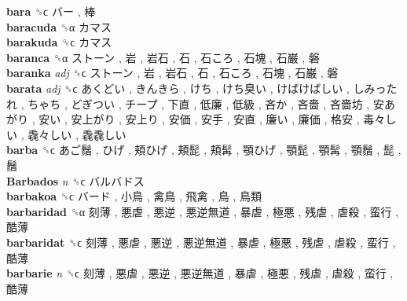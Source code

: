 \textbf{bara} ␝ϲ   バー ,  棒   \\
\textbf{baracuda} ␝α   カマス   \\
\textbf{barakuda} ␝ϲ   カマス   \\
\textbf{baranca} ␝α   ストーン ,  岩 ,  岩石 ,  石 ,  石ころ ,  石塊 ,  石巌 ,  磐   \\
\textbf{baranka} \emph{adj}  ␝ϲ   ストーン ,  岩 ,  岩石 ,  石 ,  石ころ ,  石塊 ,  石巌 ,  磐   \\
\textbf{barata} \emph{adj}  ␝ϲ   あくどい ,  きんきら ,  けち ,  けち臭い ,  けばけばしい ,  しみったれ ,  ちゃち ,  どぎつい ,  チープ ,  下直 ,  低廉 ,  低級 ,  吝か ,  吝嗇 ,  吝嗇坊 ,  安あがり ,  安い ,  安上がり ,  安上り ,  安価 ,  安手 ,  安直 ,  廉い ,  廉価 ,  格安 ,  毒々しい ,  毳々しい ,  毳毳しい   \\
\textbf{barba} ␝ϲ   あご鬚 ,  ひげ ,  頬ひげ ,  頬髭 ,  頬髯 ,  顎ひげ ,  顎髭 ,  顎髯 ,  顎鬚 ,  髭 ,  鬚   \\
\textbf{Barbados} \emph{n}  ␝ϲ   バルバドス   \\
\textbf{barbakoa} ␝ϲ   バード ,  小鳥 ,  禽鳥 ,  飛禽 ,  鳥 ,  鳥類   \\
\textbf{barbaridad} ␝α   刻薄 ,  悪虐 ,  悪逆 ,  悪逆無道 ,  暴虐 ,  極悪 ,  残虐 ,  虐殺 ,  蛮行 ,  酷薄   \\
\textbf{barbaridat} ␝ϲ   刻薄 ,  悪虐 ,  悪逆 ,  悪逆無道 ,  暴虐 ,  極悪 ,  残虐 ,  虐殺 ,  蛮行 ,  酷薄   \\
\textbf{barbarie} \emph{n}  ␝ϲ   刻薄 ,  悪虐 ,  悪逆 ,  悪逆無道 ,  暴虐 ,  極悪 ,  残虐 ,  虐殺 ,  蛮行 ,  酷薄   \\
